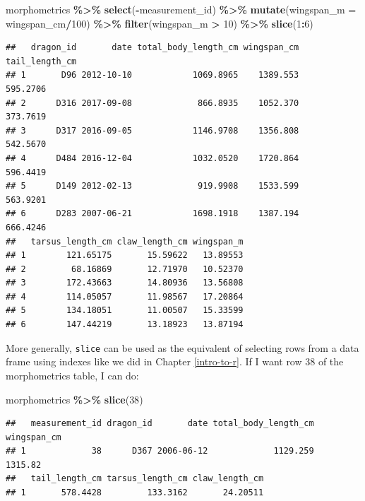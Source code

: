 \documentclass[
]{book}
\newenvironment{Shaded}{\begin{snugshade}}{\end{snugshade}}
\newcommand{\AttributeTok}[1]{\textcolor[rgb]{0.13,0.29,0.53}{#1}}
\newcommand{\DecValTok}[1]{\textcolor[rgb]{0.00,0.00,0.81}{#1}}
\newcommand{\FunctionTok}[1]{\textcolor[rgb]{0.13,0.29,0.53}{\textbf{#1}}}
\newcommand{\NormalTok}[1]{#1}
\newcommand{\SpecialCharTok}[1]{\textcolor[rgb]{0.81,0.36,0.00}{\textbf{#1}}}
\begin{document}
\begin{Shaded}
\begin{Highlighting}[]
\NormalTok{morphometrics }\SpecialCharTok{\%\textgreater{}\%} 
  \FunctionTok{select}\NormalTok{(}\SpecialCharTok{{-}}\NormalTok{measurement\_id) }\SpecialCharTok{\%\textgreater{}\%} 
  \FunctionTok{mutate}\NormalTok{(}\AttributeTok{wingspan\_m =}\NormalTok{ wingspan\_cm}\SpecialCharTok{/}\DecValTok{100}\NormalTok{) }\SpecialCharTok{\%\textgreater{}\%} 
  \FunctionTok{filter}\NormalTok{(wingspan\_m }\SpecialCharTok{\textgreater{}} \DecValTok{10}\NormalTok{) }\SpecialCharTok{\%\textgreater{}\%} 
  \FunctionTok{slice}\NormalTok{(}\DecValTok{1}\SpecialCharTok{:}\DecValTok{6}\NormalTok{)}
\end{Highlighting}
\end{Shaded}

\begin{verbatim}
##   dragon_id       date total_body_length_cm wingspan_cm tail_length_cm
## 1       D96 2012-10-10            1069.8965    1389.553       595.2706
## 2      D316 2017-09-08             866.8935    1052.370       373.7619
## 3      D317 2016-09-05            1146.9708    1356.808       542.5670
## 4      D484 2016-12-04            1032.0520    1720.864       596.4419
## 5      D149 2012-02-13             919.9908    1533.599       563.9201
## 6      D283 2007-06-21            1698.1918    1387.194       666.4246
##   tarsus_length_cm claw_length_cm wingspan_m
## 1        121.65175       15.59622   13.89553
## 2         68.16869       12.71970   10.52370
## 3        172.43663       14.80936   13.56808
## 4        114.05057       11.98567   17.20864
## 5        134.18051       11.00507   15.33599
## 6        147.44219       13.18923   13.87194
\end{verbatim}

More generally, \texttt{slice} can be used as the equivalent of selecting rows from a
data frame using indexes like we did in Chapter \ref{intro-to-r}. If I want
row 38 of the morphometrics table, I can do:

\begin{Shaded}
\begin{Highlighting}[]
\NormalTok{morphometrics }\SpecialCharTok{\%\textgreater{}\%} 
  \FunctionTok{slice}\NormalTok{(}\DecValTok{38}\NormalTok{)}
\end{Highlighting}
\end{Shaded}

\begin{verbatim}
##   measurement_id dragon_id       date total_body_length_cm wingspan_cm
## 1             38      D367 2006-06-12             1129.259     1315.82
##   tail_length_cm tarsus_length_cm claw_length_cm
## 1       578.4428         133.3162       24.20511
\end{verbatim}
\end{document}
